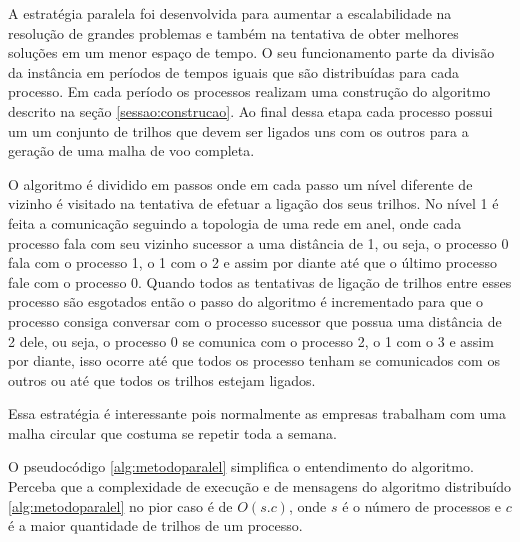 A estratégia paralela foi desenvolvida para aumentar a escalabilidade na
resolução de grandes problemas e também na tentativa de obter melhores soluções
em um menor espaço de tempo. O seu funcionamento parte da divisão da instância
em períodos de tempos iguais que são distribuídas para cada processo. Em cada
período os processos realizam uma construção do algoritmo descrito na seção
\ref{sessao:construcao}. Ao final dessa etapa cada processo possui um um
conjunto de trilhos que devem ser ligados uns com os outros para a geração de
uma malha de voo completa.
 
O algoritmo é dividido em passos onde em cada passo um
nível diferente de vizinho é visitado na tentativa de efetuar a ligação dos seus
trilhos. No nível 1 é feita a comunicação seguindo a topologia de uma
rede em anel, onde cada processo fala com seu vizinho sucessor a uma distância
de 1, ou seja, o processo 0 fala com o processo 1, o 1 com o 2 e assim por
diante até que o último processo fale com o processo 0. Quando todos as tentativas de
ligação de trilhos entre esses processo são esgotados então o passo do algoritmo
é incrementado para que o processo consiga conversar com o processo sucessor que
possua uma distância de 2 dele, ou seja, o processo 0 se comunica com o processo
2, o 1 com o 3 e assim por diante, isso ocorre até que todos os processo tenham
se comunicados com os outros ou até que todos os trilhos estejam ligados.

Essa estratégia é interessante pois normalmente as empresas trabalham com uma
malha circular que costuma se repetir toda a semana.

O pseudocódigo \ref{alg:metodoparalel} simplifica o entendimento do algoritmo.
Perceba que a complexidade de execução e de mensagens do algoritmo distribuído
\ref{alg:metodoparalel} no pior caso é de $O(s.c)$, onde $s$ é o número de
processos e $c$ é a maior quantidade de trilhos de um processo.


